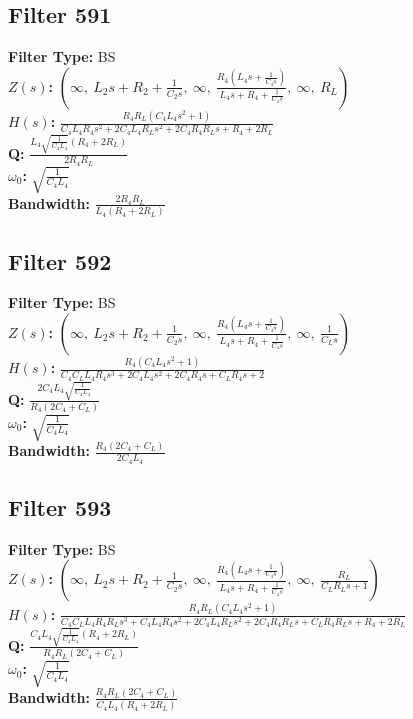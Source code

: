 \documentclass{article}
\begin{document}
\subsection*{Filter 591}
\textbf{Filter Type:} BS \\ 
\textbf{$Z(s)$:} $\left( \infty, \  L_{2} s + R_{2} + \frac{1}{C_{2} s}, \  \infty, \  \frac{R_{4} \left(L_{4} s + \frac{1}{C_{4} s}\right)}{L_{4} s + R_{4} + \frac{1}{C_{4} s}}, \  \infty, \  R_{L}\right)$ \\ 
\textbf{$H(s)$:} $\frac{R_{4} R_{L} \left(C_{4} L_{4} s^{2} + 1\right)}{C_{4} L_{4} R_{4} s^{2} + 2 C_{4} L_{4} R_{L} s^{2} + 2 C_{4} R_{4} R_{L} s + R_{4} + 2 R_{L}}$ \\ 
\textbf{Q:} $\frac{L_{4} \sqrt{\frac{1}{C_{4} L_{4}}} \left(R_{4} + 2 R_{L}\right)}{2 R_{4} R_{L}}$ \\ 
\textbf{$\omega_0$:} $\sqrt{\frac{1}{C_{4} L_{4}}}$ \\ 
\textbf{Bandwidth:} $\frac{2 R_{4} R_{L}}{L_{4} \left(R_{4} + 2 R_{L}\right)}$ \\ 
\subsection*{Filter 592}
\textbf{Filter Type:} BS \\ 
\textbf{$Z(s)$:} $\left( \infty, \  L_{2} s + R_{2} + \frac{1}{C_{2} s}, \  \infty, \  \frac{R_{4} \left(L_{4} s + \frac{1}{C_{4} s}\right)}{L_{4} s + R_{4} + \frac{1}{C_{4} s}}, \  \infty, \  \frac{1}{C_{L} s}\right)$ \\ 
\textbf{$H(s)$:} $\frac{R_{4} \left(C_{4} L_{4} s^{2} + 1\right)}{C_{4} C_{L} L_{4} R_{4} s^{3} + 2 C_{4} L_{4} s^{2} + 2 C_{4} R_{4} s + C_{L} R_{4} s + 2}$ \\ 
\textbf{Q:} $\frac{2 C_{4} L_{4} \sqrt{\frac{1}{C_{4} L_{4}}}}{R_{4} \left(2 C_{4} + C_{L}\right)}$ \\ 
\textbf{$\omega_0$:} $\sqrt{\frac{1}{C_{4} L_{4}}}$ \\ 
\textbf{Bandwidth:} $\frac{R_{4} \left(2 C_{4} + C_{L}\right)}{2 C_{4} L_{4}}$ \\ 
\subsection*{Filter 593}
\textbf{Filter Type:} BS \\ 
\textbf{$Z(s)$:} $\left( \infty, \  L_{2} s + R_{2} + \frac{1}{C_{2} s}, \  \infty, \  \frac{R_{4} \left(L_{4} s + \frac{1}{C_{4} s}\right)}{L_{4} s + R_{4} + \frac{1}{C_{4} s}}, \  \infty, \  \frac{R_{L}}{C_{L} R_{L} s + 1}\right)$ \\ 
\textbf{$H(s)$:} $\frac{R_{4} R_{L} \left(C_{4} L_{4} s^{2} + 1\right)}{C_{4} C_{L} L_{4} R_{4} R_{L} s^{3} + C_{4} L_{4} R_{4} s^{2} + 2 C_{4} L_{4} R_{L} s^{2} + 2 C_{4} R_{4} R_{L} s + C_{L} R_{4} R_{L} s + R_{4} + 2 R_{L}}$ \\ 
\textbf{Q:} $\frac{C_{4} L_{4} \sqrt{\frac{1}{C_{4} L_{4}}} \left(R_{4} + 2 R_{L}\right)}{R_{4} R_{L} \left(2 C_{4} + C_{L}\right)}$ \\ 
\textbf{$\omega_0$:} $\sqrt{\frac{1}{C_{4} L_{4}}}$ \\ 
\textbf{Bandwidth:} $\frac{R_{4} R_{L} \left(2 C_{4} + C_{L}\right)}{C_{4} L_{4} \left(R_{4} + 2 R_{L}\right)}$ \\ 
\end{document}
